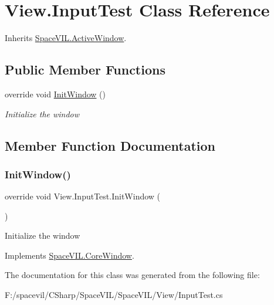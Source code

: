 \hypertarget{class_view_1_1_input_test}{}\section{View.\+Input\+Test Class Reference}
\label{class_view_1_1_input_test}


Inherits \mbox{\hyperlink{class_space_v_i_l_1_1_active_window}{Space\+V\+I\+L.\+Active\+Window}}.

\subsection*{Public Member Functions}
\begin{DoxyCompactItemize}
\item 
override void \mbox{\hyperlink{class_view_1_1_input_test_a9887db9b33135e82710ac4c02ffcec52}{Init\+Window}} ()
\begin{DoxyCompactList}\small\item\em Initialize the window \end{DoxyCompactList}\end{DoxyCompactItemize}


\subsection{Member Function Documentation}
\mbox{\label{class_view_1_1_input_test_a9887db9b33135e82710ac4c02ffcec52}} 
\subsubsection{\texorpdfstring{Init\+Window()}{InitWindow()}}
{\footnotesize\ttfamily override void View.\+Input\+Test.\+Init\+Window (\begin{DoxyParamCaption}{ }\end{DoxyParamCaption})\hspace{0.3cm}{\ttfamily [virtual]}}



Initialize the window 



Implements \mbox{\hyperlink{class_space_v_i_l_1_1_core_window_aa3cf4ac54d9651b1149584dc81042824}{Space\+V\+I\+L.\+Core\+Window}}.



The documentation for this class was generated from the following file\+:\begin{DoxyCompactItemize}
\item 
F\+:/spacevil/\+C\+Sharp/\+Space\+V\+I\+L/\+Space\+V\+I\+L/\+View/Input\+Test.\+cs\end{DoxyCompactItemize}
